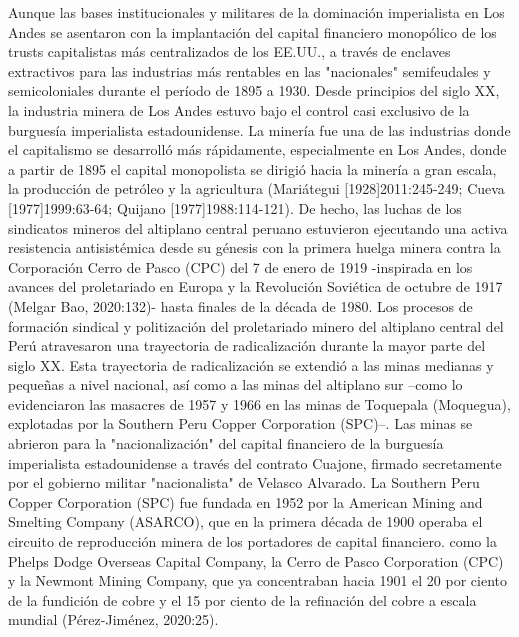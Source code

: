 \documentclass[]{interact}
\theoremstyle{plain}%
\theoremstyle{definition}
\theoremstyle{remark}
\begin{document}
Aunque las bases institucionales y militares de la dominación imperialista en Los Andes se asentaron con la implantación del capital financiero monopólico de los trusts capitalistas más centralizados de los EE.UU., a través de enclaves extractivos para las industrias más rentables en las "nacionales" semifeudales y semicoloniales durante el período de 1895 a 1930. Desde principios del siglo XX, la industria minera de Los Andes estuvo bajo el control casi exclusivo de la burguesía imperialista estadounidense. La minería fue una de las industrias donde el capitalismo se desarrolló más rápidamente, especialmente en Los Andes, donde a partir de 1895 el capital monopolista se dirigió hacia la minería a gran escala, la producción de petróleo y la agricultura (Mariátegui [1928]2011:245-249; Cueva [1977]1999:63-64; Quijano [1977]1988:114-121). De hecho, las luchas de los sindicatos mineros del altiplano central peruano estuvieron ejecutando una activa resistencia antisistémica desde su génesis con la primera huelga minera contra la Corporación Cerro de Pasco (CPC) del 7 de enero de 1919 -inspirada en los avances del proletariado en Europa y la Revolución Soviética de octubre de 1917 (Melgar Bao, 2020:132)- hasta finales de la década de 1980. Los procesos de formación sindical y politización del proletariado minero del altiplano central del Perú atravesaron una trayectoria de radicalización durante la mayor parte del siglo XX. Esta trayectoria de radicalización se extendió a las minas medianas y pequeñas a nivel nacional, así como a las minas del altiplano sur –como lo evidenciaron las masacres de 1957 y 1966 en las minas de Toquepala (Moquegua), explotadas por la Southern Peru Copper Corporation (SPC)–. Las minas se abrieron para la "nacionalización" del capital financiero de la burguesía imperialista estadounidense a través del contrato Cuajone, firmado secretamente por el gobierno militar "nacionalista" de Velasco Alvarado. La Southern Peru Copper Corporation (SPC) fue fundada en 1952 por la American Mining and Smelting Company (ASARCO), que en la primera década de 1900 operaba el circuito de reproducción minera de los portadores de capital financiero. como la Phelps Dodge Overseas Capital Company, la Cerro de Pasco Corporation (CPC) y la Newmont Mining Company, que ya concentraban hacia 1901 el 20 por ciento de la fundición de cobre y el 15 por ciento de la refinación del cobre a escala mundial (Pérez-Jiménez, 2020:25). 
\end{document}
